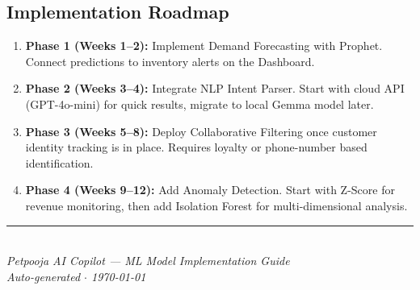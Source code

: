 \documentclass[12pt, a4paper]{article}
\begin{document}
\subsection{Implementation Roadmap}

\begin{enumerate}
    \item \textbf{Phase 1 (Weeks 1--2):} Implement Demand Forecasting with Prophet. Connect predictions to inventory alerts on the Dashboard.
    \item \textbf{Phase 2 (Weeks 3--4):} Integrate NLP Intent Parser. Start with cloud API (GPT-4o-mini) for quick results, migrate to local Gemma model later.
    \item \textbf{Phase 3 (Weeks 5--8):} Deploy Collaborative Filtering once customer identity tracking is in place. Requires loyalty or phone-number based identification.
    \item \textbf{Phase 4 (Weeks 9--12):} Add Anomaly Detection. Start with Z-Score for revenue monitoring, then add Isolation Forest for multi-dimensional analysis.
\end{enumerate}

\vfill
\begin{center}
{\color{orange}\rule{8cm}{1.5pt}}\\[8pt]
{\color{gray}\textit{Petpooja AI Copilot --- ML Model Implementation Guide}}\\[4pt]
{\color{gray}\textit{Auto-generated $\cdot$ \today}}
\end{center}
\end{document}
